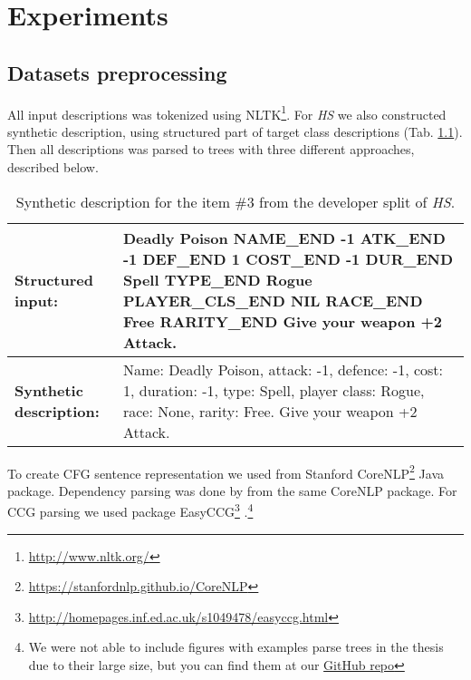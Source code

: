 \chapter{Experiments} \label{Chapter5} 

\section{Datasets preprocessing} \label{preprocessing}

All input descriptions was tokenized using NLTK\footnote{\href{http://www.nltk.org/}{http://www.nltk.org/}}. For \emph{HS} we also constructed synthetic description, using structured part of target class descriptions (Tab. \ref{table:hs_input}). Then all descriptions was parsed to trees with three different approaches, described below.

\begin{table}[h]
\begin{tabularx}{\textwidth}{ l X }
\hline
\textbf{Structured input:} & Deadly Poison NAME\_END -1 ATK\_END -1 DEF\_END 1 COST\_END -1 DUR\_END Spell TYPE\_END Rogue PLAYER\_CLS\_END NIL RACE\_END Free RARITY\_END Give your weapon +2 Attack. \\
\hline 
\textbf{Synthetic description:} & Name: Deadly Poison, attack: -1, defence: -1, cost: 1, duration: -1, type: Spell, player class: Rogue, race: None, rarity: Free. Give your weapon +2 Attack. \\
\hline
\end{tabularx}
\caption[Synthetic description example]{Synthetic description for the item \#3 from the developer split of \emph{HS}.}
\label{table:hs_input}
\end{table}

To create CFG sentence representation we used  \parencite{klein2003} from Stanford CoreNLP\footnote{\href{https://stanfordnlp.github.io/CoreNLP}{https://stanfordnlp.github.io/CoreNLP}} Java package. Dependency parsing was done by  \parencite{chen2014} from the same CoreNLP package. For CCG parsing we used package EasyCCG\footnote{\href{http://homepages.inf.ed.ac.uk/s1049478/easyccg.html}{http://homepages.inf.ed.ac.uk/s1049478/easyccg.html}} \parencite{lewis2014}.\footnote{We were not able to include figures with examples parse trees in the thesis due to their large size, but you can find them at our \href{https://github.com/tsdaemon/treelstm-code-generation/tree/master/pictures}{GitHub repo}}


